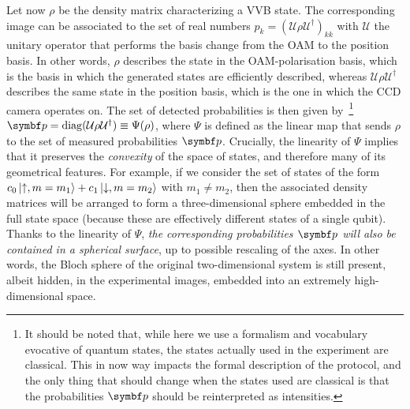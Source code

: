 Let now $\rho$ be the density matrix characterizing a \ac{VVB} state. The corresponding image can be associated to the set of real numbers $p_k=(\mathcal U\rho\mathcal U^\dagger)_{kk}$ with $\mathcal U$ the unitary operator that performs the basis change from the \ac{OAM} to the position basis. In other words, $\rho$ describes the state in the OAM-polarisation basis, which is the basis in which the generated states are efficiently described, whereas $\mathcal U\rho\mathcal U^\dagger$ describes the same state in the position basis, which is the one in which the CCD camera operates on.
The set of detected probabilities is then given by~\footnote{It should be noted that, while here we use a formalism and vocabulary evocative of quantum states, the states actually used in the experiment are classical. This in now way impacts the formal description of the protocol, and the only thing that should change when the states used are classical is that the probabilities $\bs p$ should be reinterpreted as intensities.}
$\bs p=\on{diag}(\mathcal U\rho\mathcal U^\dagger)\equiv\Psi(\rho)$,
where $\Psi$ is defined as the linear map that sends $\rho$ to the set of measured probabilities $\bs p$.
Crucially, the linearity of $\Psi$ implies that it preserves the \emph{convexity} of the space of states, and therefore many of its geometrical features.
For example, if we consider the set of states of the form $c_0 \ket{\uparrow,m=m_1} + c_1 \ket{\downarrow,m=m_2}$ with $m_1\neq m_2$, then the associated density matrices will be arranged to form a three-dimensional sphere embedded in the full state space (because these are effectively different states of a single qubit).
Thanks to the linearity of $\Psi$, \emph{the corresponding probabilities $\bs p$ will also be contained in a spherical surface}, up to possible rescaling of the axes.
In other words, the Bloch sphere of the original two-dimensional system is still present, albeit hidden, in the experimental images, embedded into an extremely high-dimensional space.


